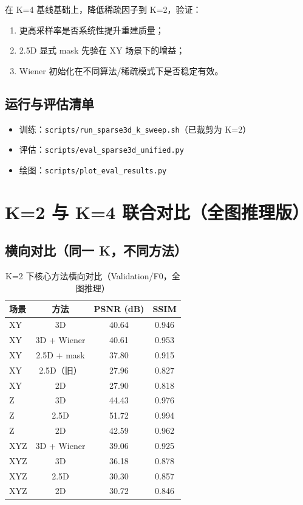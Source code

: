 \documentclass[UTF8, scheme=plain, 11pt, a4paper]{ctexart}
\begin{document}
在 K=4 基线基础上，降低稀疏因子到 K=2，验证：
\begin{enumerate}[leftmargin=*]
  \item 更高采样率是否系统性提升重建质量；
  \item 2.5D 显式 mask 先验在 XY 场景下的增益；
  \item Wiener 初始化在不同算法/稀疏模式下是否稳定有效。
\end{enumerate}

\subsection{运行与评估清单}

\begin{itemize}
  \item 训练：\texttt{scripts/run\_sparse3d\_k\_sweep.sh}（已裁剪为 K=2）
  \item 评估：\texttt{scripts/eval\_sparse3d\_unified.py}
  \item 绘图：\texttt{scripts/plot\_eval\_results.py}
\end{itemize}

\section{K=2 与 K=4 联合对比（全图推理版）}

\subsection{横向对比（同一 K，不同方法）}

\begin{table}[H]
  \centering
  \caption{K=2 下核心方法横向对比（Validation/F0，全图推理）}
  \begin{tabular}{lccc}
    \toprule
    场景 & 方法 & PSNR (dB) & SSIM \\
    \midrule
    XY & 3D & 40.64 & 0.946 \\
    XY & 3D + Wiener & 40.61 & 0.953 \\
    XY & 2.5D + mask & 37.80 & 0.915 \\
    XY & 2.5D（旧） & 27.96 & 0.827 \\
    XY & 2D & 27.90 & 0.818 \\
    \midrule
    Z & 3D & 44.43 & 0.976 \\
    Z & 2.5D & 51.72 & 0.994 \\
    Z & 2D & 42.59 & 0.962 \\
    \midrule
    XYZ & 3D + Wiener & 39.06 & 0.925 \\
    XYZ & 3D & 36.18 & 0.878 \\
    XYZ & 2.5D & 30.30 & 0.857 \\
    XYZ & 2D & 30.72 & 0.846 \\
    \bottomrule
  \end{tabular}
\end{table}
\end{document}
